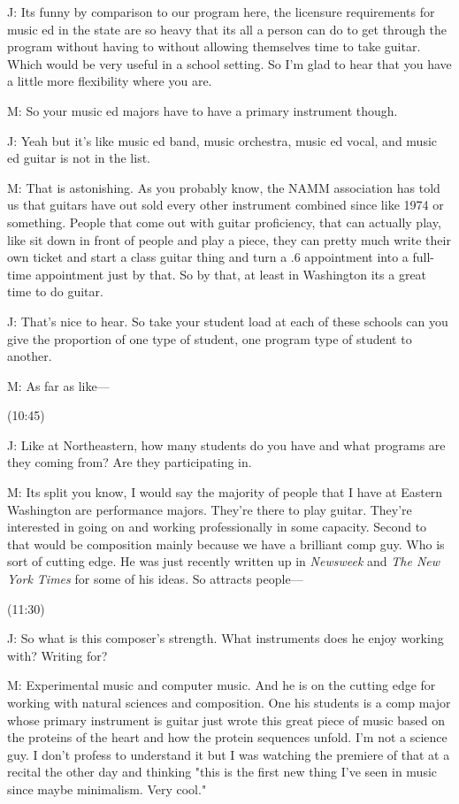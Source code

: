 \documentclass[11pt]{article}
\begin{document}
J: Its funny by comparison to our program here, the licensure requirements for music ed in the state are so heavy that its all a person can do to get through the program without having to without allowing themselves time to take guitar. Which would be very useful in a school setting. So I'm glad to hear that you have a little more flexibility where you are. 

M: So your music ed majors have to have a primary instrument though.

J: Yeah but it's like music ed band, music orchestra, music ed vocal, and music ed guitar is not in the list. 

M: That is astonishing. As you probably know, the NAMM association has told us that guitars have out sold every other instrument combined since like 1974 or something. People that come out with guitar proficiency, that can actually play, like sit down in front of people and play a piece, they can pretty much write their own ticket and start a class guitar thing and turn a .6 appointment into a full-time appointment just by that. So by that, at least in Washington its a great time to do guitar. 

J: That's nice to hear. So take your student load at each of these schools can you give the proportion of one type of student, one program type of student to another. 

M: As far as like—

(10:45)

J: Like at Northeastern, how many students do you have and what programs are they coming from? Are they participating in.

M: Its split you know, I would say the majority of people that I have at Eastern Washington are performance majors. They're there to play guitar. They're interested in going on and working professionally in some capacity. Second to that would be composition mainly because we have a brilliant comp guy. Who is sort of cutting edge. He was just recently written up in \emph{Newsweek} and \emph{The New York Times} for some of his ideas. So attracts people—

(11:30)

J: So what is this composer's strength. What instruments does he enjoy working with? Writing for?

M: Experimental music and computer music. And he is on the cutting edge for working with natural sciences and composition. One his students is a comp major whose primary instrument is guitar just wrote this great piece of music based on the proteins of the heart and how the protein sequences unfold. I'm not a science guy. I don't profess to understand it but I was watching the premiere of that at a recital the other day and thinking "this is the first new thing I've seen in music since maybe minimalism. Very cool." 
\end{document}
